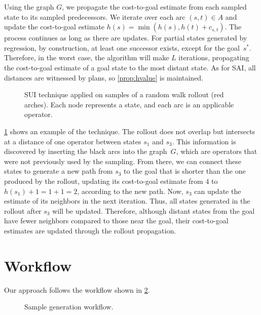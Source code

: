 Using the graph $G$, we propagate the cost-to-goal estimate from each sampled state to its sampled predecessors. We iterate over each arc $(s,t) \in A$ and update the cost-to-goal estimate $h(s) = \min(h(s), h(t)+c_{s,t})$. The process continues as long as there are updates. For partial states generated by regression, by construction, at least one successor exists, except for the goal~$s^*$. Therefore, in the worst case, the algorithm will make $L$ iterations, propagating the cost-to-goal estimate of a goal state to the most distant state. As for SAI, all distances are witnessed by plans, so \cref{prop:hvalue} is maintained.

\begin{figure}[tb]
    \caption[SUI technique applied to samples of a random walk rollout.]{SUI technique applied on samples of a random walk rollout (red arches). Each node represents a state, and each arc is an applicable operator.}
    \label{fig:sui}
    \addmargin
    \centering
    
\end{figure}

\cref{fig:sui} shows an example of the technique. The rollout does not overlap but intersects at a distance of one operator between states $s_1$ and $s_3$. This information is discovered by inserting the black arcs into the graph~$G$, which are operators that were not previously used by the sampling. From there, we can connect these states to generate a new path from $s_3$ to the goal that is shorter than the one produced by the rollout, updating its cost-to-goal estimate from $4$ to $h(s_1)+1=1+1=2$, according to the new path. Now, $s_3$ can update the estimate of its neighbors in the next iteration. Thus, all states generated in the rollout after $s_3$ will be updated. Therefore, although distant states from the goal have fewer neighbors compared to those near the goal, their cost-to-goal estimates are updated through the rollout propagation.

\section{Workflow}
\label{sec:workflow}

Our approach follows the workflow shown in \cref{fig:workflow}.

\begin{figure}[tb]
    \caption{Sample generation workflow.}
    \label{fig:workflow}
    \addmargin
    \centering
    
\end{figure}

